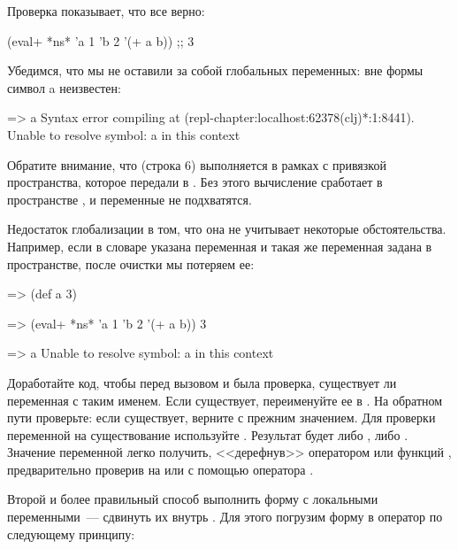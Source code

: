 Проверка показывает, что все верно:

\begin{english}
  \begin{clojure}
(eval+ *ns* {'a 1 'b 2} '(+ a b))
;; 3
  \end{clojure}
\end{english}

Убедимся, что мы не оставили за собой глобальных переменных: вне формы  символ a неизвестен:

\begin{english}
  \begin{text}
=> a
Syntax error compiling at (repl-chapter:localhost:62378(clj)*:1:8441).
Unable to resolve symbol: a in this context
  \end{text}
\end{english}

Обратите внимание, что  (строка 6) выполняется в рамках  с привязкой пространства, которое передали в . Без этого вычисление сработает в пространстве , и переменные не подхватятся.

Недостаток глобализации в том, что она не учитывает некоторые обстоятельства. Например, если в словаре указана переменная  и такая же переменная задана в пространстве, после очистки мы потеряем ее:

\begin{english}
  \begin{clojure}
=> (def a 3)

=> (eval+ *ns* {'a 1 'b 2} '(+ a b))
3

=> a
Unable to resolve symbol: a in this context
  \end{clojure}
\end{english}

Доработайте код, чтобы перед вызовом  и  была проверка, существует ли переменная с таким именем. Если существует, переименуйте ее в . На обратном пути проверьте: если  существует, верните  с прежним значением. Для проверки переменной на существование используйте . Результат будет либо , либо . Значение переменной легко получить, <<дерефнув>>  оператором  или функций , предварительно проверив на  или с помощью оператора .

Второй и более правильный способ выполнить форму с локальными переменными~--- сдвинуть их внутрь . Для этого погрузим форму в оператор  по следующему принципу:

